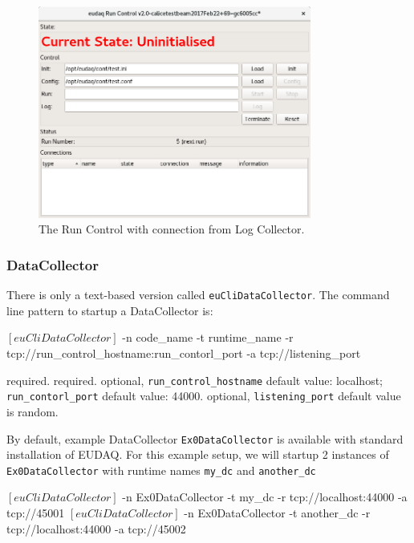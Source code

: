 \begin{figure}[htb]
  \begin{center}
    \includegraphics[width=0.8\textwidth]{src/images/RunControl}
    \caption{The Run Control with connection from Log Collector.}
    \label{fig:RunControl_con_log}
  \end{center}
\end{figure}


\subsubsection{DataCollector}
\label{sec:datacollector}
There is only a text-based version called \texttt{euCliDataCollector}.
The command line pattern to startup a DataCollector is:
\begin{listing}[mybash]
$[euCliDataCollector]$ -n {code_name} -t {runtime_name} -r tcp://{run_control_hostname}:{run_contorl_port} -a tcp://{listening_port}
\end{listing}

\begin{description}
required.
required.
optional, \texttt{run\_control\_hostname} default value: localhost;  \texttt{run\_contorl\_port}  default value: 44000.
optional, \texttt{listening\_port} default value is random.
\end{description}

By default, example DataCollector \texttt{Ex0DataCollector} is available with standard installation of EUDAQ.
For this example setup, we will startup 2 instances of \texttt{Ex0DataCollector} with runtime names \texttt{my\_dc} and \texttt{another\_dc}\\
\begin{listing}[mybash]
$[euCliDataCollector]$ -n Ex0DataCollector -t my_dc -r tcp://localhost:44000 -a tcp://45001
$[euCliDataCollector]$ -n Ex0DataCollector -t another_dc -r tcp://localhost:44000 -a tcp://45002
\end{listing}

